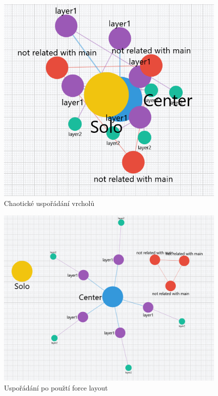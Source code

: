 \begin{figure}[h]
    \centering
    \includegraphics[width=0.6\linewidth]{Images/Chaos.png}
    \caption{Chaotické uspořádání vrcholů}
    \label{fig:chaos}
\end{figure}
\begin{figure}[h]
    \centering
    \includegraphics[width=0.7\linewidth]{Images/ordered.png}
    \caption{Uspořádání po použtí force layout}
    \label{fig:order}
\end{figure}
\newpage
